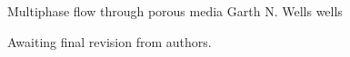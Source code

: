               {Multiphase flow through porous media}
              {Garth N. Wells}
              {wells}

Awaiting final revision from authors.
